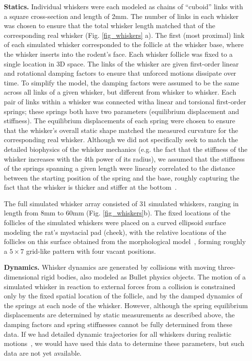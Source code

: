 \textbf{Statics.} Individual whiskers were each modeled as chains of ``cuboid'' links with a square cross-section and length of 2mm.   
The number of links in each whisker was chosen to ensure that the total whisker length matched that of the corresponding real whisker (Fig. \ref{fig_whiskers} a).
The first (most proximal) link of each simulated whisker corresponded to the follicle at the whisker base, where the whisker inserts into the rodent's face. 
Each whisker follicle was fixed to a single location in 3D space.  
The links of the whisker are given first-order linear and rotational damping factors to ensure that unforced motions dissipate over time. 
To simplify the model, the damping factors were assumed to be the same across all links of a given whisker, but different from whisker to whisker.   
Each pair of links within a whisker was connected witha  linear and torsional first-order springs; these springs both have two parameters (equilibrium displacement and stiffness). 
The equilibrium displacements of each spring were chosen to ensure that the whisker's overall static shape matched the measured curvature for the corresponding real whisker.  
Although we did not specifically seek to match the detailed biophysics of the whisker mechanics (e.g. the fact that the stiffness of the whisker increases with the 4th power of its radius),   
we assumed that the stiffness of the springs spanning a given length were linearly correlated to the distance between the starting position of the spring and the base, roughly capturing the fact that the whisker is thicker and stiffer at the bottom~\cite{Hartmann:2015}.

The full simulated whisker array consisted of 31 simulated whiskers, ranging in length from 8mm to 60mm (Fig. \ref{fig_whiskers}b). 
The fixed locations of the follicles of the simulated whiskers were placed on a curved ellipsoid surface modeling the rat's mystacial pad (cheek), with the relative locations of the follicles on this surface obtained from the morphological model~\cite{Towal2011}, forming roughly a $5\times7$ grid-like pattern with four vacant positions.

\textbf{Dynamics.} Whisker dynamics are generated by collisions with moving three-dimensional rigid bodies, also modeled as Bullet physics objects.  
The motion of a simulated whisker in reaction to external forces from a collision is constrained only by the fixed spatial location of the follicle, and by the damped dynamics of the springs at each node of the whisker. 
However, although the spring equilibrium displacements are determined by static measurements as described above, the damping factors and spring stiffnesses cannot be fully determined from these data.  
If we had detailed dynamic trajectories for all whiskers during realistic motions~\cite{}, we would have used this data to determine these parameters, but such data are not yet available.  


